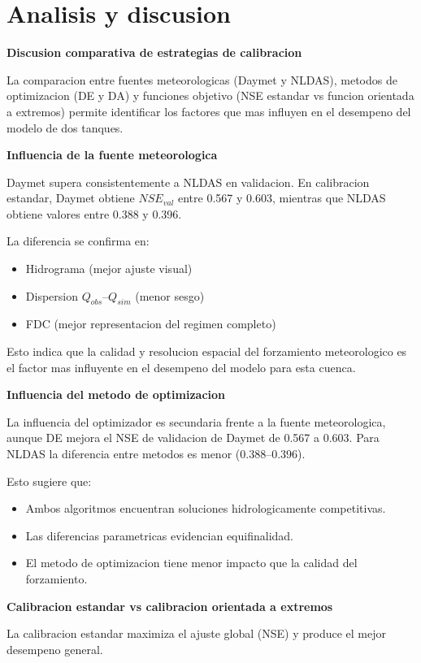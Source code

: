 \documentclass[12pt]{article}
\begin{document}
\section*{Analisis y discusion}
\textbf{Discusion comparativa de estrategias de calibracion}

La comparacion entre fuentes meteorologicas (Daymet y NLDAS), metodos de optimizacion (DE y DA) y funciones objetivo (NSE estandar vs funcion orientada a extremos) permite identificar los factores que mas influyen en el desempeno del modelo de dos tanques.

\textbf{Influencia de la fuente meteorologica}

Daymet supera consistentemente a NLDAS en validacion. En calibracion estandar, Daymet obtiene $NSE_{val}$ entre 0.567 y 0.603, mientras que NLDAS obtiene valores entre 0.388 y 0.396.

La diferencia se confirma en:
\begin{itemize}
\item Hidrograma (mejor ajuste visual)
\item Dispersion $Q_{obs}$--$Q_{sim}$ (menor sesgo)
\item FDC (mejor representacion del regimen completo)
\end{itemize}

Esto indica que la calidad y resolucion espacial del forzamiento meteorologico es el factor mas influyente en el desempeno del modelo para esta cuenca.

\textbf{Influencia del metodo de optimizacion}

La influencia del optimizador es secundaria frente a la fuente meteorologica, aunque DE mejora el NSE de validacion de Daymet de 0.567 a 0.603. Para NLDAS la diferencia entre metodos es menor (0.388--0.396).

Esto sugiere que:
\begin{itemize}
\item Ambos algoritmos encuentran soluciones hidrologicamente competitivas.
\item Las diferencias parametricas evidencian equifinalidad.
\item El metodo de optimizacion tiene menor impacto que la calidad del forzamiento.
\end{itemize}

\textbf{Calibracion estandar vs calibracion orientada a extremos}

La calibracion estandar maximiza el ajuste global (NSE) y produce el mejor desempeno general.
\end{document}
